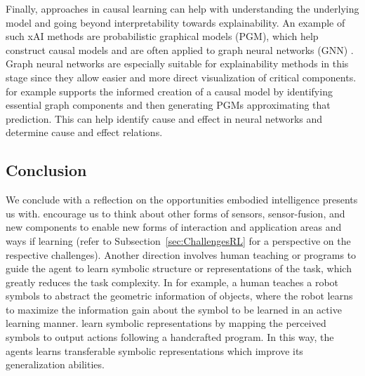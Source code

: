 \documentclass[twoside,11pt]{article}
\begin{document}
\begin{enumerate}
Finally, approaches in causal learning can help with understanding the underlying model and going beyond interpretability towards explainability.
An example of such xAI methods are probabilistic graphical models (PGM), which help construct causal models and are often applied to graph neural networks (GNN) \citep{Saranti:2019:LearningCompetencePGMs}. Graph neural networks are especially suitable for explainability methods in this stage since they allow easier and more direct visualization of critical components. \citet{Vu:2020:PGMExplainer} for example supports the informed creation of a causal model by identifying essential graph components and then generating PGMs approximating that prediction. This can help identify cause and effect in neural networks and determine cause and effect relations.

\subsection{Conclusion}

We conclude with a reflection on the opportunities embodied intelligence presents us with. \citet{RoyEtAl:2021:RLRoboticsChallenges} encourage us to think about other forms of sensors, sensor-fusion, and new components to enable new forms of interaction and application areas and ways if learning (refer to Subsection~\ref{sec:ChallengesRL} for a perspective on the respective challenges). Another direction involves human teaching \citep{kulick2013active} or programs \citep{PenkovR19,sun2019program} to guide the agent to learn symbolic structure or representations of the task, which greatly reduces the task complexity. In \citet{kulick2013active} for example, a human teaches a robot symbols to abstract the geometric information of objects, where the robot learns to maximize the information gain about the symbol to be learned in an active learning manner. \citet{PenkovR19} learn symbolic representations by mapping the perceived symbols to output actions following a handcrafted program. In this way, the agents learns transferable symbolic representations which improve its generalization abilities.


\end{enumerate}
\end{document}
